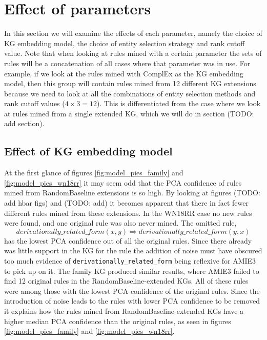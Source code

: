 \section{Effect of parameters}
In this section we will examine the effects of each parameter, namely the choice of KG embedding model, the choice of entity selection strategy and rank cutoff value. Note that when looking at rules mined with a certain parameter the sets of rules will be a concatenation of all cases where that parameter was in use. For example, if we look at the rules mined with ComplEx as the KG embedding model, then this group will contain rules mined from 12 different KG extensions because we need to look at all the combinations of entity selection methods and rank cutoff values ($4\times3=12$). This is differentiated from the case where we look at rules mined from a single extended KG, which we will do in section (TODO: add section).

\subsection{Effect of KG embedding model}
At the first glance of figures \ref{fig:model_pies_family} and \ref{fig:model_pies_wn18rr} it may seem odd that the PCA confidence of rules mined from RandomBaseline extensions is so high. By looking at figures (TODO: add hbar figs) and (TODO: add) it becomes apparent that there in fact fewer different rules mined from these extensions. In the WN18RR case no new rules were found, and one original rule was also never mined. The omitted rule,
\[derivationally\_related\_form(x, y)   \Rightarrow derivationally\_related\_form(y, x)\]
has the lowest PCA confidence out of all the original rules. Since there already was little support in the KG for the rule the addition of noise must have obscured too much evidence of \texttt{derivationally\_related\_form} being reflexive for AMIE3 to pick up on it. The family KG produced similar results, where AMIE3 failed to find 12 original rules in the RandomBaseline-extended KGs. All of these rules were among those with the lowest PCA confidence of the original rules.
Since the introduction of noise leads to the rules with lower PCA confidence to be removed it explains how the rules mined from RandomBaseline-extended KGs have a higher median PCA confidence than the original rules, as seen in figures \ref{fig:model_pies_family} and \ref{fig:model_pies_wn18rr}.

